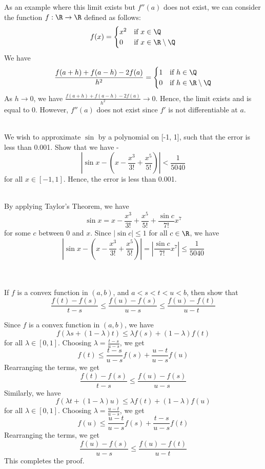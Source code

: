 \documentclass[openany]{book}
\begin{document}
As an example where this limit exists but $f''(a)$ does not exist, we can consider the function $f: \R \to \R$ defined as follows:
\[ f(x) = \begin{cases}
    x^2 & \text{if } x \in \Q \\
    0 & \text{if } x \in \R \setminus \Q
\end{cases}
\]
We have
\[ \frac{f(a + h) + f(a - h) - 2f(a)}{h^2} = \begin{cases}
    1 & \text{if } h \in \Q \\
    0 & \text{if } h \in \R \setminus \Q
\end{cases}
\]
As $h \to 0$, we have $\frac{f(a + h) + f(a - h) - 2f(a)}{h^2} \to 0$. Hence, the limit exists and is equal to $0$. However, $f''(a)$ does not exist since $f'$ is not differentiable at $a$. \\\\
\begin{exercise}
    We wish to approximate $\sin$ by a polynomial on [-1, 1], such that the error is less than 0.001. Show that we have - 
\[ \left|\sin x - \left(x - \frac{x^3}{3!} + \frac{x^5}{5!}\right)\right| < \frac{1}{5040} \]
for all $x \in [-1, 1]$. Hence, the error is less than 0.001.
\end{exercise} \\
 By applying Taylor's Theorem, we have
\[ \sin x = x - \frac{x^3}{3!} + \frac{x^5}{5!} + \frac{\sin c}{7!} x^7 \]
for some $c$ between $0$ and $x$. Since $|\sin c| \leq 1$ for all $c \in \R$, we have
\[ \left|\sin x - \left(x - \frac{x^3}{3!} + \frac{x^5}{5!}\right)\right| = \left|\frac{\sin c}{7!} x^7\right| \leq \frac{1}{5040} \]
\\\\
\begin{exercise}
    If $f$ is a convex function in $(a, b)$, and $a < s < t < u < b$, then show that
\[ \frac{f(t) - f(s)}{t - s} \leq \frac{f(u) - f(s)}{u - s} \leq \frac{f(u) - f(t)}{u - t} \]
\end{exercise}
 Since $f$ is a convex function in $(a, b)$, we have
\[ f(\lambda s + (1 - \lambda) t) \leq \lambda f(s) + (1 - \lambda) f(t) \]
for all $\lambda \in [0, 1]$. Choosing $\lambda = \frac{t-s}{u-s}$, we get
\[ f(t) \leq \frac{t-s}{u-s} f(s) + \frac{u-t}{u-s} f(u) \]
Rearranging the terms, we get
\[ \frac{f(t) - f(s)}{t - s} \leq \frac{f(u) - f(s)}{u - s} \]
Similarly, we have
\[ f(\lambda t + (1 - \lambda) u) \leq \lambda f(t) + (1 - \lambda) f(u) \]
for all $\lambda \in [0, 1]$. Choosing $\lambda = \frac{u-t}{u-s}$, we get
\[ f(u) \leq \frac{u-t}{u-s} f(s) + \frac{t-s}{u-s} f(t) \]
Rearranging the terms, we get
\[ \frac{f(u) - f(s)}{u - s} \leq \frac{f(u) - f(t)}{u - t} \]
This completes the proof.
\end{document}
